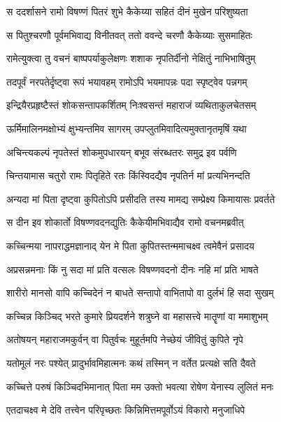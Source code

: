 
\twolineshloka
{स ददर्शासने रामो विषण्णं पितरं शुभे}
{कैकेय्या सहितं दीनं मुखेन परिशुष्यता} %

\twolineshloka
{स पितुश्चरणौ पूर्वमभिवाद्य विनीतवत्}
{ततो ववन्दे चरणौ कैकेय्याः सुसमाहितः} %

\twolineshloka
{रामेत्युक्त्वा तु वचनं बाष्पपर्याकुलेक्षणः}
{शशाक नृपतिर्दीनो नेक्षितुं नाभिभाषितुम्} %

\twolineshloka
{तदपूर्वं नरपतेर्दृष्ट्वा रूपं भयावहम्}
{रामोऽपि भयमापन्नः पदा स्पृष्ट्वेव पन्नगम्} %

\twolineshloka
{इन्द्रियैरप्रहृष्टैस्तं शोकसन्तापकर्शितम्}
{निःश्वसन्तं महाराजं व्यथिताकुलचेतसम्} %

\twolineshloka
{ऊर्मिमालिनमक्षोभ्यं क्षुभ्यन्तमिव सागरम्}
{उपप्लुतमिवादित्यमुक्तानृतमृषिं यथा} %

\twolineshloka
{अचिन्त्यकल्पं नृपतेस्तं शोकमुपधारयन्}
{बभूव संरब्धतरः समुद्र इव पर्वणि} %

\twolineshloka
{चिन्तयामास चतुरो रामः पितृहिते रतः}
{किंस्विदद्यैव नृपतिर्न मां प्रत्यभिनन्दति} %

\twolineshloka
{अन्यदा मां पिता दृष्ट्वा कुपितोऽपि प्रसीदति}
{तस्य मामद्य सम्प्रेक्ष्य किमायासः प्रवर्तते} %

\twolineshloka
{स दीन इव शोकार्तो विषण्णवदनद्युतिः}
{कैकेयीमभिवाद्यैव रामो वचनमब्रवीत्} %

\twolineshloka
{कच्चिन्मया नापराद्धमज्ञानाद् येन मे पिता}
{कुपितस्तन्ममाचक्ष्व त्वमेवैनं प्रसादय} %

\twolineshloka
{अप्रसन्नमनाः किं नु सदा मां प्रति वत्सलः}
{विषण्णवदनो दीनः नहि मां प्रति भाषते} %

\twolineshloka
{शारीरो मानसो वापि कच्चिदेनं न बाधते}
{सन्तापो वाभितापो वा दुर्लभं हि सदा सुखम्} %

\twolineshloka
{कच्चिन्न किञ्चिद् भरते कुमारे प्रियदर्शने}
{शत्रुघ्ने वा महासत्त्वे मातॄणां वा ममाशुभम्} %

\twolineshloka
{अतोषयन् महाराजमकुर्वन् वा पितुर्वचः}
{मुहूर्तमपि नेच्छेयं जीवितुं कुपिते नृपे} %

\twolineshloka
{यतोमूलं नरः पश्येत् प्रादुर्भावमिहात्मनः}
{कथं तस्मिन् न वर्तेत प्रत्यक्षे सति दैवते} %

\twolineshloka
{कच्चित्ते परुषं किञ्चिदभिमानात् पिता मम}
{उक्तो भवत्या रोषेण येनास्य लुलितं मनः} %

\twolineshloka
{एतदाचक्ष्व मे देवि तत्त्वेन परिपृच्छतः}
{किन्निमित्तमपूर्वोऽयं विकारो मनुजाधिपे} %

